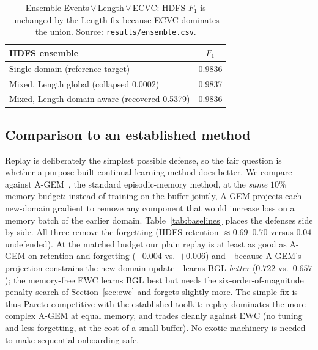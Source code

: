 \documentclass[journal]{IEEEtran}
\begin{document}
\begin{table}[t]
\caption{Ensemble Events\,$\lor$\,Length\,$\lor$\,ECVC: HDFS $F_1$ is unchanged by the Length fix
because ECVC dominates the union. Source: \texttt{results/ensemble.csv}.}
\label{tab:ens}
\centering
\begin{tabular}{@{}lc@{}}
\toprule
HDFS ensemble & $F_1$ \\
\midrule
Single-domain (reference target) & 0.9836 \\
Mixed, Length global (collapsed 0.0002) & 0.9837 \\
Mixed, Length domain-aware (recovered 0.5379) & 0.9836 \\
\bottomrule
\end{tabular}
\end{table}

\subsection{Comparison to an established method}\label{sec:baselines}
Replay is deliberately the simplest possible defense, so the fair question is whether a purpose-built
continual-learning method does better. We compare against A-GEM~\cite{agem2019}, the standard
episodic-memory method, at the \emph{same} $10\%$ memory budget: instead of training on the buffer
jointly, A-GEM projects each new-domain gradient to remove any component that would increase loss on a
memory batch of the earlier domain. Table~\ref{tab:baselines} places the defenses side by side. All
three remove the forgetting (HDFS retention $\approx0.69$--$0.70$ versus $0.04$ undefended). At the
matched budget our plain replay is at least as good as A-GEM on retention and forgetting
($+0.004$ vs.\ $+0.006$) and---because A-GEM's projection constrains the new-domain update---learns BGL
\emph{better} ($0.722$ vs.\ $0.657$); the memory-free EWC learns BGL best but needs the
six-order-of-magnitude penalty search of Section~\ref{sec:ewc} and forgets slightly more. The simple
fix is thus Pareto-competitive with the established toolkit: replay dominates the more complex A-GEM at
equal memory, and trades cleanly against EWC (no tuning and less forgetting, at the cost of a small
buffer). No exotic machinery is needed to make sequential onboarding safe.
\end{document}
